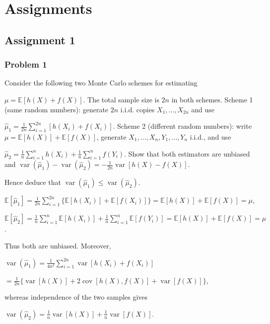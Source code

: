 \section{Assignments}

\subsection{Assignment 1}

\subsubsection*{Problem 1}

 Consider the following two Monte Carlo schemes for estimating

$\mu=\mathbb{E}[h(X)+f(X)]$.
The total sample size is $2n$ in both schemes. Scheme 1 (same random numbers): generate $2n$ i.i.d. copies $X_1,\ldots,X_{2n}$ and use

$\widehat\mu_1=\frac1{2n}\sum_{i=1}^{2n}[h(X_i)+f(X_i)]$.
Scheme 2 (different random numbers): write $\mu=\mathbb{E}[h(X)]+\mathbb{E}[f(X)]$, generate $X_1,\ldots,X_n,Y_1,\ldots,Y_n$ i.i.d., and use

$\widehat\mu_2=\frac1n\sum_{i=1}^nh(X_i)+\frac1n\sum_{i=1}^nf(Y_i)$.
Show that both estimators are unbiased and
$\operatorname{var}(\widehat\mu_1)-\operatorname{var}(\widehat\mu_2)=-\frac1{2n}\operatorname{var}[h(X)-f(X)]$.

Hence deduce that $\operatorname{var}(\widehat\mu_1)\leq\operatorname{var}(\widehat\mu_2)$.


$\mathbb{E}[\widehat\mu_1]=\frac1{2n}\sum_{i=1}^{2n}\{\mathbb{E}[h(X_i)]+\mathbb{E}[f(X_i)]\}=\mathbb{E}[h(X)]+\mathbb{E}[f(X)]=\mu$,

$\mathbb{E}[\widehat\mu_2]=\frac1n\sum_{i=1}^n\mathbb{E}[h(X_i)]+\frac1n\sum_{i=1}^n\mathbb{E}[f(Y_i)]=\mathbb{E}[h(X)]+\mathbb{E}[f(X)]=\mu$.

Thus both are unbiased. Moreover,

$\operatorname{var}(\widehat\mu_1)=\frac1{4n^2}\sum_{i=1}^{2n}\operatorname{var}[h(X_i)+f(X_i)]$

$=\frac1{2n}\{\operatorname{var}[h(X)]+2\operatorname{cov}[h(X),f(X)]+\operatorname{var}[f(X)]\}$,

whereas independence of the two samples gives

$\operatorname{var}(\widehat\mu_2)=\frac1n\operatorname{var}[h(X)]+\frac1n\operatorname{var}[f(X)]$.


